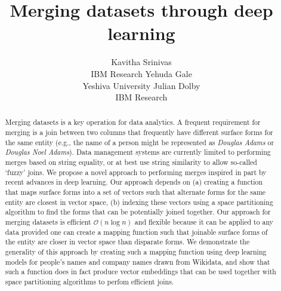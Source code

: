 \documentclass[letterpaper]{article} %
\begin{document}
%
\title{Merging datasets through deep learning}


\author{Kavitha Srinivas \\ IBM Research
\And Yehuda Gale \\ Yeshiva University
\And Julian Dolby \\ IBM Research}


\maketitle
\begin{abstract}
Merging datasets is a key operation for data analytics.  A frequent requirement for merging is a join between two columns that frequently have different surface forms for the same entity (e.g., the name of a person might be represented as \textit{Douglas Adams} or \textit{Douglas Noel Adams}).  Data management systems are currently limited to performing merges based on string equality, or at best use string similarity to allow so-called `fuzzy' joins.  We propose a novel approach to performing merges inspired in part by recent advances in deep learning.  Our approach depends on (a) creating a function that maps surface forms into a set of vectors such that alternate forms for the same entity are closest in vector space, (b) indexing these vectors using a space partitioning algorithm to find the forms that can be potentially joined together.  Our approach for merging datasets is efficient $\mathcal{O}(n\log{}n)$ and flexible because it can be applied to any data provided one can create a mapping function such that joinable surface forms of the entity are closer in vector space than disparate forms.  We demonstrate the generality of this approach by creating such a mapping function using deep learning models for people's names and company names drawn from Wikidata, and show that such a function does in fact produce vector embeddings that can be used together with space partitioning algorithms to perfom efficient joins.
\end{abstract}






  
  
  
\end{document}
